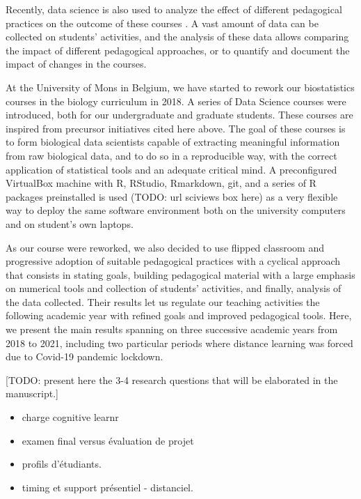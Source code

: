 \documentclass{aims}
\theoremstyle{definition}
\begin{document}
Recently, data science is also used to analyze the effect of different
pedagogical practices on the outcome of these courses
\cite{Estrellado2020}. A vast amount of data can be collected on
students' activities, and the analysis of these data allows comparing
the impact of different pedagogical approaches, or to quantify and
document the impact of changes in the courses.

At the University of Mons in Belgium, we have started to rework our
biostatistics courses in the biology curriculum in 2018. A series of
Data Science courses were introduced, both for our undergraduate and
graduate students. These courses are inspired from precursor initiatives
cited here above. The goal of these courses is to form biological data
scientists capable of extracting meaningful information from raw
biological data, and to do so in a reproducible way, with the correct
application of statistical tools and an adequate critical mind. A
preconfigured VirtualBox machine with R, RStudio, Rmarkdown, git, and a
series of R packages preinstalled is used (TODO: url sciviews box here)
as a very flexible way to deploy the same software environment both on
the university computers and on student's own laptops.

As our course were reworked, we also decided to use flipped classroom
and progressive adoption of suitable pedagogical practices with a
cyclical approach that consists in stating goals, building pedagogical
material with a large emphasis on numerical tools and collection of
students' activities, and finally, analysis of the data collected. Their
results let us regulate our teaching activities the following academic
year with refined goals and improved pedagogical tools. Here, we present
the main results spanning on three successive academic years from 2018
to 2021, including two particular periods where distance learning was
forced due to Covid-19 pandemic lockdown.

{[}TODO: present here the 3-4 research questions that will be elaborated
in the manuscript.{]}

\begin{itemize}
\item
  charge cognitive learnr
\item
  examen final versus évaluation de projet
\item
  profils d'étudiants.
\item
  timing et support présentiel - distanciel.
\end{itemize}
\end{document}
